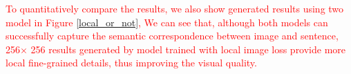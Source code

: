 \documentclass[10pt,twocolumn,letterpaper]{article}
\begin{document}
\textcolor{red}{To quantitatively compare the results, we also show generated results using two model in Figure \ref{local_or_not}, We can see that, although both models can successfully capture the semantic correspondence between image and sentence, 256$\times$ 256 results generated by model trained with local image loss provide more local fine-grained details, thus improving the visual quality. }


%			

\end{document}
